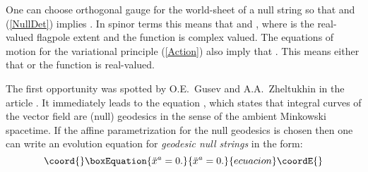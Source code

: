 \documentclass[a4paper,twocolumn,showkeys,showpacs,aps]{revtex4}
\begin{document}
One can choose orthogonal gauge for the world-sheet of a null
string so that \coordHE{} and (\ref{NullDet}) implies
\coordHE{}. In spinor terms this means that
\coordHE{} and
\coordHE{}, where \coordHE{} is the
real-valued flagpole extent and the function \myHighlight{$\zeta(\tau,\sigma)$}\coordHE{}
is complex valued. The equations of motion for the variational
principle (\ref{Action}) also imply that
\coordHE{}. This means either that
\coordHE{} or the function \myHighlight{$\zeta$}\coordHE{} is real-valued.

The first opportunity was spotted by O.E.~Gusev and
A.A.~Zheltukhin in the article \cite{Gusev-Zheltukhin}. It
immediately leads to the equation \coordHE{}, which states that integral curves of the vector
field \coordHE{} are (null) geodesics in the sense of the
ambient Minkowski spacetime. If the affine parametrization for the
null geodesics is chosen then one can write an evolution equation
for \textit{geodesic null strings} in the form:
\begin{equation}\coord{}\boxEquation{\label{EvGeod}
\ddot{x}{}^a=0.
}{\ddot{x}{}^a=0.
}{ecuacion}\coordE{}\end{equation}
\end{document}
